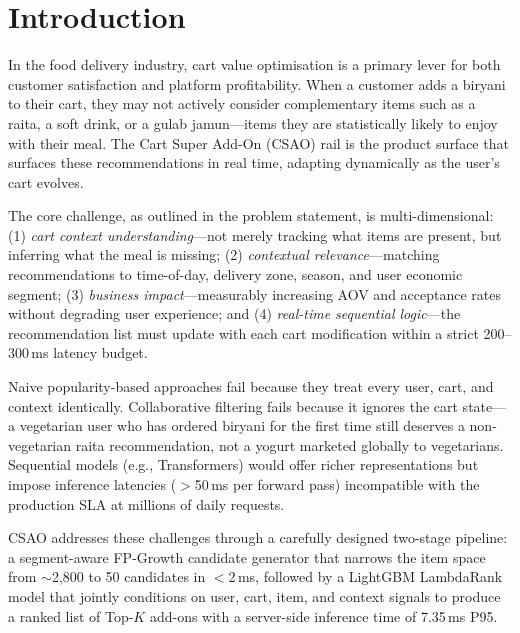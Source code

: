 \documentclass[conference]{IEEEtran}
\begin{document}
\section{Introduction}

In the food delivery industry, cart value optimisation is a primary lever for
both customer satisfaction and platform profitability. When a customer adds a
biryani to their cart, they may not actively consider complementary items such
as a raita, a soft drink, or a gulab jamun---items they are statistically likely
to enjoy with their meal. The Cart Super Add-On (CSAO) rail is the product
surface that surfaces these recommendations in real time, adapting dynamically
as the user's cart evolves.

The core challenge, as outlined in the problem statement, is multi-dimensional:
(1) \emph{cart context understanding}---not merely tracking what items are
present, but inferring what the meal is missing; (2) \emph{contextual
relevance}---matching recommendations to time-of-day, delivery zone, season,
and user economic segment; (3) \emph{business impact}---measurably increasing
AOV and acceptance rates without degrading user experience; and
(4) \emph{real-time sequential logic}---the recommendation list must update
with each cart modification within a strict 200--300\,ms latency budget.

Naive popularity-based approaches fail because they treat every user, cart, and
context identically. Collaborative filtering fails because it ignores the cart
state---a vegetarian user who has ordered biryani for the first time still
deserves a non-vegetarian raita recommendation, not a yogurt marketed globally
to vegetarians. Sequential models (e.g., Transformers) would offer richer
representations but impose inference latencies ($>$50\,ms per forward pass)
incompatible with the production SLA at millions of daily requests.

CSAO addresses these challenges through a carefully designed
two-stage pipeline: a segment-aware FP-Growth candidate generator that narrows
the item space from $\sim$2,800 to 50 candidates in $<$2\,ms, followed by a
LightGBM LambdaRank model that jointly conditions on user, cart, item, and
context signals to produce a ranked list of Top-$K$ add-ons with a server-side
inference time of 7.35\,ms P95.
\end{document}

